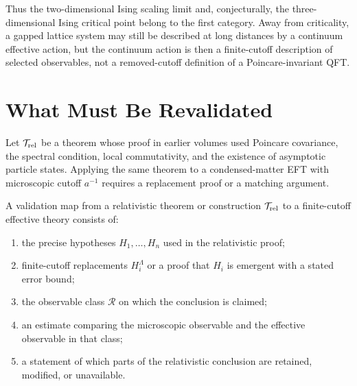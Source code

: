 Thus the two-dimensional Ising scaling limit and, conjecturally, the
three-dimensional Ising critical point belong to the first category.  Away
from criticality, a gapped lattice system may still be described at long
distances by a continuum effective action, but the continuum action is then a
finite-cutoff description of selected observables, not a removed-cutoff
definition of a Poincare-invariant QFT.

\section{What Must Be Revalidated}

Let \(\mathcal T_{\rm rel}\) be a theorem whose proof in earlier volumes used
Poincare covariance, the spectral condition, local commutativity, and the
existence of asymptotic particle states.  Applying the same theorem to a
condensed-matter EFT with microscopic cutoff \(a^{-1}\) requires a replacement
proof or a matching argument.

\begin{definition}
\label{def:validation-map-borrowed-qft}
A validation map from a relativistic theorem or construction
\(\mathcal T_{\rm rel}\) to a finite-cutoff effective theory consists of:
\begin{enumerate}
\item the precise hypotheses \(H_1,\ldots,H_n\) used in the relativistic
      proof;
\item finite-cutoff replacements \(H_i^\Lambda\) or a proof that \(H_i\) is
      emergent with a stated error bound;
\item the observable class \(\mathcal R\) on which the conclusion is claimed;
\item an estimate comparing the microscopic observable and the effective
      observable in that class;
\item a statement of which parts of the relativistic conclusion are retained,
      modified, or unavailable.
\end{enumerate}
\end{definition}

